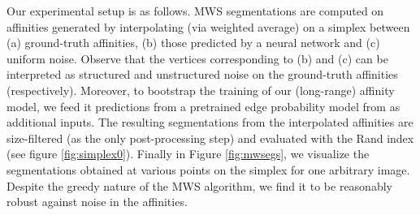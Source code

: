Our experimental setup is as follows. MWS segmentations are computed on affinities generated by interpolating (via weighted average) on a simplex between (a) ground-truth affinities, (b) those predicted by a neural network
and (c) uniform noise. Observe that the vertices corresponding to (b) and (c) can be interpreted as structured and unstructured noise on the ground-truth affinities (respectively). Moreover, to bootstrap the training of our (long-range) affinity model, we feed it predictions from a pretrained edge probability model from \cite{xie2015holistically} as additional inputs. The resulting segmentations from the interpolated affinities are size-filtered (as the only post-processing step) and evaluated with the Rand index (see figure \ref{fig:simplex0}). Finally in Figure \ref{fig:mwsegs}, we visualize the segmentations obtained at various points on the simplex for one arbitrary image.
Despite the greedy nature of the MWS algorithm, we find it to be reasonably robust against noise in the affinities.
